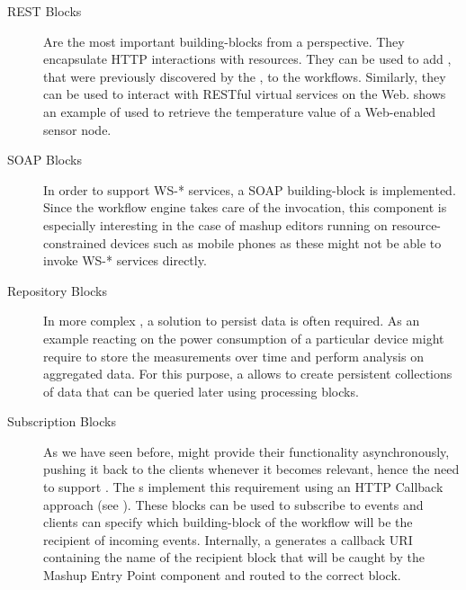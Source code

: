 \begin{description}
 \item[REST Blocks] Are the most important building-blocks from a \WoT{} perspective. They encapsulate HTTP interactions with resources. They can be used to add \sts{}, that were previously discovered by the , to the workflows. Similarly, they can be used to interact with RESTful virtual services on the Web.  shows an example of  used to retrieve the temperature value of a Web-enabled sensor node. 

 \item[SOAP Blocks] In order to support WS-* services, a SOAP building-block is implemented. Since the workflow engine takes care of the invocation, this component is especially interesting in the case of mashup editors running on resource-constrained devices such as mobile phones as these might not be able to invoke WS-* services directly. 

 \item[Repository Blocks] In more complex \pMashups, a solution to persist data is often required. As an example reacting on the power consumption of a particular device might require to store the measurements over time and perform analysis on aggregated data. For this purpose, a  allows to create persistent collections of data that can be queried later using processing blocks.

 \item[Subscription Blocks] As we have seen before, \sts{} might provide their functionality asynchronously, pushing it back to the clients whenever it becomes relevant, hence the need to support . The s implement this requirement using an HTTP Callback approach (see ). These blocks can be used to subscribe to events and clients can specify which building-block of the workflow will be the recipient of incoming events. Internally, a  generates a callback URI containing the name of the recipient block that will be caught by the Mashup Entry Point component and routed to the correct block.
 \end{description}



